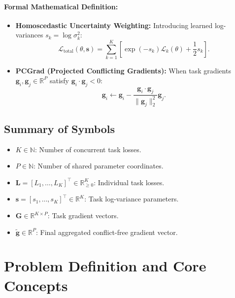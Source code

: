\documentclass[11pt]{article}
\begin{document}
\paragraph{Formal Mathematical Definition:}
\begin{itemize}
    \item \textbf{Homoscedastic Uncertainty Weighting:} Introducing learned log-variances $s_k = \log\sigma_k^2$:
    \begin{equation}
    \label{eq:uncertainty_def}
    \mathcal{L}_{\mathrm{total}}(\theta, \mathbf{s}) = \sum_{k=1}^K \left[ \exp(-s_k) \mathcal{L}_k(\theta) + \frac{1}{2} s_k \right].
    \end{equation}
    \item \textbf{PCGrad (Projected Conflicting Gradients):} When task gradients $\mathbf{g}_i, \mathbf{g}_j \in \mathbb{R}^P$ satisfy $\mathbf{g}_i \cdot \mathbf{g}_j < 0$:
    \begin{equation}
    \label{eq:pcgrad_def}
    \mathbf{g}_i \gets \mathbf{g}_i - \frac{\mathbf{g}_i \cdot \mathbf{g}_j}{\|\mathbf{g}_j\|_2^2} \mathbf{g}_j.
    \end{equation}
\end{itemize}

\subsection{Summary of Symbols}
\begin{itemize}
    \item $K \in \mathbb{N}$: Number of concurrent task losses.
    \item $P \in \mathbb{N}$: Number of shared parameter coordinates.
    \item $\mathbf{L} = [L_1, \dots, L_K]^\top \in \mathbb{R}_{\ge 0}^K$: Individual task losses.
    \item $\mathbf{s} = [s_1, \dots, s_K]^\top \in \mathbb{R}^K$: Task log-variance parameters.
    \item $\mathbf{G} \in \mathbb{R}^{K \times P}$: Task gradient vectors.
    \item $\tilde{\mathbf{g}} \in \mathbb{R}^P$: Final aggregated conflict-free gradient vector.
\end{itemize}

\section{Problem Definition and Core Concepts}
\label{sec:problem_definition}
\end{document}
